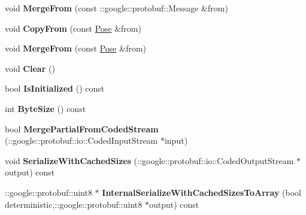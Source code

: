 \begin{DoxyCompactItemize}
\item 
void {\bfseries Merge\+From} (const \+::google\+::protobuf\+::\+Message \&from)\hypertarget{classvss__debug_1_1Pose_a9c52bad876948ec4182d2c246f6e2a0d}{}\label{classvss__debug_1_1Pose_a9c52bad876948ec4182d2c246f6e2a0d}

\item 
void {\bfseries Copy\+From} (const \hyperlink{classvss__debug_1_1Pose}{Pose} \&from)\hypertarget{classvss__debug_1_1Pose_a4125d0ee96483793a5c8bbdacdfdce8a}{}\label{classvss__debug_1_1Pose_a4125d0ee96483793a5c8bbdacdfdce8a}

\item 
void {\bfseries Merge\+From} (const \hyperlink{classvss__debug_1_1Pose}{Pose} \&from)\hypertarget{classvss__debug_1_1Pose_a5a597ecd1ddff2e2ee5b84104960e2fa}{}\label{classvss__debug_1_1Pose_a5a597ecd1ddff2e2ee5b84104960e2fa}

\item 
void {\bfseries Clear} ()\hypertarget{classvss__debug_1_1Pose_a8f26357da9330adecfb3f238874b38c9}{}\label{classvss__debug_1_1Pose_a8f26357da9330adecfb3f238874b38c9}

\item 
bool {\bfseries Is\+Initialized} () const \hypertarget{classvss__debug_1_1Pose_a2f4c8f757103bb3a3de2b49a563f2ef4}{}\label{classvss__debug_1_1Pose_a2f4c8f757103bb3a3de2b49a563f2ef4}

\item 
int {\bfseries Byte\+Size} () const \hypertarget{classvss__debug_1_1Pose_af0f58169c73aba135cc58bd2361ca1e5}{}\label{classvss__debug_1_1Pose_af0f58169c73aba135cc58bd2361ca1e5}

\item 
bool {\bfseries Merge\+Partial\+From\+Coded\+Stream} (\+::google\+::protobuf\+::io\+::\+Coded\+Input\+Stream $\ast$input)\hypertarget{classvss__debug_1_1Pose_abc6b6c968cfc9995bb41c81f3902c888}{}\label{classvss__debug_1_1Pose_abc6b6c968cfc9995bb41c81f3902c888}

\item 
void {\bfseries Serialize\+With\+Cached\+Sizes} (\+::google\+::protobuf\+::io\+::\+Coded\+Output\+Stream $\ast$output) const \hypertarget{classvss__debug_1_1Pose_abb7022905e578e39930138239e7c11e4}{}\label{classvss__debug_1_1Pose_abb7022905e578e39930138239e7c11e4}

\item 
\+::google\+::protobuf\+::uint8 $\ast$ {\bfseries Internal\+Serialize\+With\+Cached\+Sizes\+To\+Array} (bool deterministic,\+::google\+::protobuf\+::uint8 $\ast$output) const \hypertarget{classvss__debug_1_1Pose_a762a458f4ab5d6cfa495ed5ec8b82790}{}\label{classvss__debug_1_1Pose_a762a458f4ab5d6cfa495ed5ec8b82790}


\end{DoxyCompactItemize}
